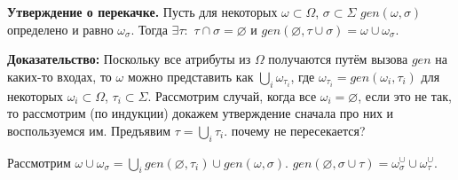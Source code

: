 



\textbf{Утверждение о перекачке.} Пусть для некоторых $\omega \subset \Omega$, $\sigma \subset \Sigma$ $gen(\omega, \sigma)$ определено и равно $\omega_\sigma$. Тогда $\exists \tau:$ $\tau \cap \sigma = \varnothing$ и $gen(\varnothing, \tau \cup \sigma) = \omega \cup \omega_\sigma$.

\textbf{Доказательство:} Поскольку все атрибуты из $\Omega$ получаются путём вызова $gen$ на каких-то входах, то $\omega$ можно представить как $\bigcup\limits_{i} \omega_{\tau_i}$, где $\omega_{\tau_i} = gen(\omega_i, \tau_i)$ для некоторых $\omega_i \subset \Omega$, $\tau_i \subset \Sigma$. Рассмотрим случай, когда все $\omega_i = \varnothing$, если это не так, то рассмотрим (по индукции) докажем утверждение сначала про них и воспользуемся им. Предъявим $\tau = \bigcup\limits_{i} \tau_i$. почему не пересекается?

Рассмотрим $\omega \cup \omega_\sigma = \bigcup\limits_{i} gen(\varnothing, \tau_i) \cup gen(\omega, \sigma)$.
$gen(\varnothing, \sigma \cup \tau) = \omega^\cup_\sigma \cup \omega^\cup_\tau$.


